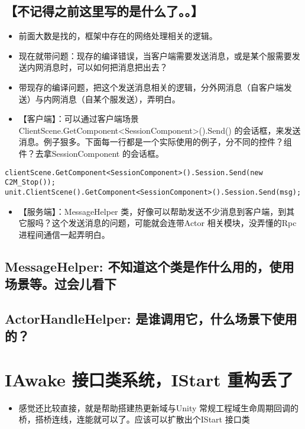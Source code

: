 \documentclass[9pt, b5paper]{article}
\begin{document}
\subsection{【不记得之前这里写的是什么了。。】}
\label{sec-1-9}
\begin{itemize}
\item 前面大数是找的，框架中存在的网络处理相关的逻辑。
\item 现在就带问题：现存的编译错误，当客户端需要发送消息，或是某个服需要发送内网消息时，可以如何把消息把出去？
\item 带现存的编译问题，把这个发送消息相关的逻辑，分外网消息（自客户端发送）与内网消息（自某个服发送），弄明白。
\item 【客户端】：可以通过客户端场景 ClientScene.GetComponent<SessionComponent>().Send() 的会话框，来发送消息。例子狠多。下面每一行都是一个实际使用的例子，分不同的控件？组件？去拿SessionComponent 的会话框。
\end{itemize}
\begin{verbatim}
clientScene.GetComponent<SessionComponent>().Session.Send(new C2M_Stop());
unit.ClientScene().GetComponent<SessionComponent>().Session.Send(msg);
\end{verbatim}
\begin{itemize}
\item 【服务端】：MessageHelper 类，好像可以帮助发送不少消息到客户端，到其它服吗？这个发送消息的问题，可能就会连带Actor 相关模块，没弄懂的Rpc 进程间通信一起弄明白。
\end{itemize}
\subsection{MessageHelper: 不知道这个类是作什么用的，使用场景等。过会儿看下}
\label{sec-1-10}
\subsection{ActorHandleHelper: 是谁调用它，什么场景下使用的？}
\label{sec-1-11}

\section{IAwake 接口类系统，IStart 重构丢了}
\label{sec-2}
\begin{itemize}
\item 感觉还比较直接，就是帮助搭建热更新域与Unity 常规工程域生命周期回调的桥，搭桥连线，连能就可以了。应该可以扩散出个IStart 接口类
\end{itemize}
\end{document}
